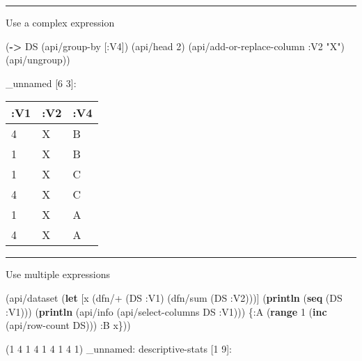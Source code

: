 \documentclass[]{article}
\newenvironment{Shaded}{\begin{snugshade}}{\end{snugshade}}
\newcommand{\AttributeTok}[1]{\textcolor[rgb]{0.77,0.63,0.00}{#1}}
\newcommand{\DecValTok}[1]{\textcolor[rgb]{0.00,0.00,0.81}{#1}}
\newcommand{\KeywordTok}[1]{\textcolor[rgb]{0.13,0.29,0.53}{\textbf{#1}}}
\newcommand{\NormalTok}[1]{#1}
\newcommand{\StringTok}[1]{\textcolor[rgb]{0.31,0.60,0.02}{#1}}
\begin{document}
\begin{center}\rule{0.5\linewidth}{0.5pt}\end{center}

Use a complex expression

\begin{Shaded}
\begin{Highlighting}[]
\NormalTok{(}\KeywordTok{->}\NormalTok{ DS}
\NormalTok{    (api/group-by [}\AttributeTok{:V4}\NormalTok{])}
\NormalTok{    (api/head }\DecValTok{2}\NormalTok{)}
\NormalTok{    (api/add-or-replace-column }\AttributeTok{:V2} \StringTok{"X"}\NormalTok{)}
\NormalTok{    (api/ungroup))}
\end{Highlighting}
\end{Shaded}

\_unnamed {[}6 3{]}:

\begin{longtable}[]{@{}lll@{}}
\toprule
:V1 & :V2 & :V4\tabularnewline
\midrule
\endhead
4 & X & B\tabularnewline
1 & X & B\tabularnewline
1 & X & C\tabularnewline
4 & X & C\tabularnewline
1 & X & A\tabularnewline
4 & X & A\tabularnewline
\bottomrule
\end{longtable}

\begin{center}\rule{0.5\linewidth}{0.5pt}\end{center}

Use multiple expressions

\begin{Shaded}
\begin{Highlighting}[]
\NormalTok{(api/dataset (}\KeywordTok{let}\NormalTok{ [x (dfn/+ (DS }\AttributeTok{:V1}\NormalTok{) (dfn/sum (DS }\AttributeTok{:V2}\NormalTok{)))]}
\NormalTok{               (}\KeywordTok{println}\NormalTok{ (}\KeywordTok{seq}\NormalTok{ (DS }\AttributeTok{:V1}\NormalTok{)))}
\NormalTok{               (}\KeywordTok{println}\NormalTok{ (api/info (api/select-columns DS }\AttributeTok{:V1}\NormalTok{)))}
\NormalTok{               \{}\AttributeTok{:A}\NormalTok{ (}\KeywordTok{range} \DecValTok{1}\NormalTok{ (}\KeywordTok{inc}\NormalTok{ (api/row-count DS)))}
                \AttributeTok{:B}\NormalTok{ x\}))}
\end{Highlighting}
\end{Shaded}

(1 4 1 4 1 4 1 4 1) \_unnamed: descriptive-stats {[}1 9{]}:
\end{document}
